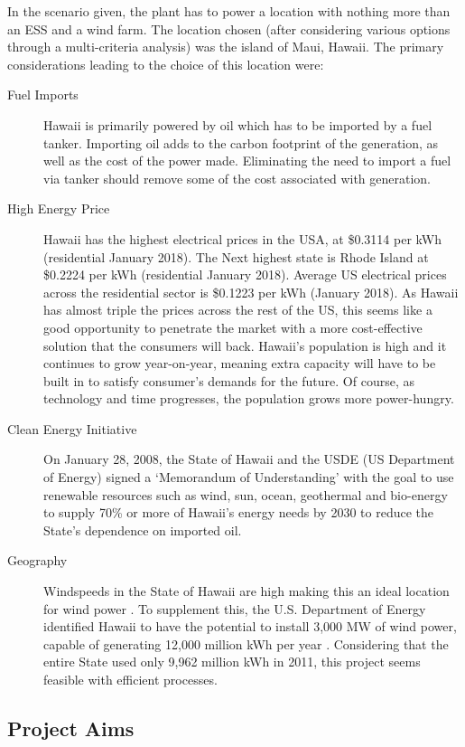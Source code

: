 In the scenario given, the plant has to power a location with nothing more than an ESS and a wind farm.
The location chosen (after considering various options through a multi-criteria analysis) was the island of Maui, Hawaii.
The primary considerations leading to the choice of this location were:
\begin{description}
        \item[Fuel Imports]{Hawaii is primarily powered by oil \cite{intro:oilimport} which has to be imported by a fuel tanker. Importing oil adds to the carbon footprint of the generation, as well as the cost of the power made. Eliminating the need to import a fuel via tanker should remove some of the cost associated with generation.}
        \item[High Energy Price]{Hawaii has the highest electrical prices in the USA, at \$0.3114 per kWh (residential January 2018)\cite{intro:price}. The Next highest state is Rhode Island at \$0.2224 per kWh (residential January 2018)\cite{intro:price}. Average US electrical prices across the residential sector is \$0.1223 per kWh (January 2018)\cite{intro:price}. As Hawaii has almost triple the prices across the rest of the US, this seems like a good opportunity to penetrate the market with a more cost-effective solution that the consumers will back.
Hawaii's population is high and it continues to grow year-on-year, meaning extra capacity will have to be built in to satisfy consumer's demands for the future. Of course, as technology and time progresses, the population grows more power-hungry.}
        \item[Clean Energy Initiative]{On January 28, 2008, the State of Hawaii and the USDE (US Department of Energy) signed a `Memorandum of Understanding' with the goal to use renewable resources such as wind, sun, ocean, geothermal and bio-energy to supply 70\% or more of Hawaii's energy needs by 2030 to reduce the State's dependence on imported oil.}
        \item[Geography]{Windspeeds in the State of Hawaii are high making this an ideal location for wind power \cite{intro:windspeed}. To supplement this, the U.S. Department of Energy identified Hawaii to have the potential to install 3,000 MW of wind power, capable of generating 12,000 million kWh per year \cite{intro:energy}.
Considering that the entire State used only 9,962 million kWh in 2011, this project seems feasible with efficient processes.}
\end{description}

\subsection{Project Aims}

